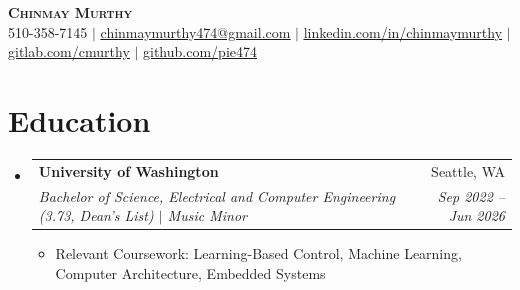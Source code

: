 \documentclass[letterpaper,11pt]{article}
\makeatletter
\newcommand{\resumeItem}[1]{
  \item\small{
    {#1 \vspace{-2pt}}
  }
}
\newcommand{\resumeSubheading}[4]{
  \vspace{-2pt}\item
    \begin{tabular*}{0.97\textwidth}[t]{l@{\extracolsep{\fill}}r}
      \textbf{#1} & #2 \\
      \textit{\small#3} & \textit{\small #4} \\
    \end{tabular*}\vspace{-7pt}
}
\newcommand{\resumeSubHeadingListStart}{\begin{itemize}[leftmargin=0.15in, label={}]}
\newcommand{\resumeSubHeadingListEnd}{\end{itemize}}
\newcommand{\resumeItemListStart}{\begin{itemize}}
\newcommand{\resumeItemListEnd}{\end{itemize}\vspace{-5pt}}
\makeatother
\begin{document}
\begin{center}
    \textbf{\Huge \scshape Chinmay Murthy} \\ \vspace{1pt}
    \small 510-358-7145 $|$ 
    \href{mailto:chinmaymurthy474@gmail.com}{\underline{chinmaymurthy474@gmail.com}} $|$ 
    \href{https://linkedin.com/in/chinmaymurthy}{\underline{linkedin.com/in/chinmaymurthy}} $|$
    \href{https://gitlab.com/cmurthy}{\underline{gitlab.com/cmurthy}} $|$
    \href{https://github.com/pie474}{\underline{github.com/pie474}}
\end{center}


\section{Education}
  \resumeSubHeadingListStart
    \resumeSubheading
      {University of Washington}{Seattle, WA}
      {Bachelor of Science, Electrical and Computer Engineering (3.73, Dean's List) $|$ Music Minor}{Sep 2022 -- Jun 2026}
      \resumeItemListStart
        \resumeItem{Relevant Coursework: Learning-Based Control, Machine Learning, Computer Architecture, Embedded Systems}
      \resumeItemListEnd
  \resumeSubHeadingListEnd

\end{document}
